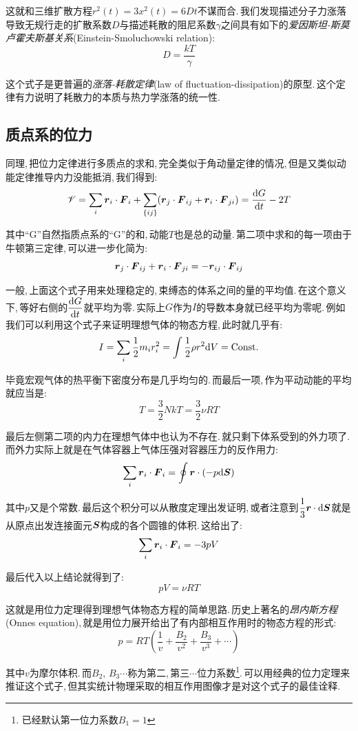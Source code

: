 这就和三维扩散方程$r^2(t)=3x^2(t)=6Dt$不谋而合.\,我们发现描述分子力涨落导致无规行走的扩散系数$D$与描述耗散的阻尼系数$\gamma$之间具有如下的\emph{爱因斯坦-斯莫卢霍夫斯基关系}(Einstein-Smoluchowski relation):
\[D=\frac{kT}{\gamma}\]

这个式子是更普遍的\emph{涨落-耗散定律}(law of fluctuation-dissipation)的原型.\,这个定律有力说明了耗散力的本质与热力学涨落的统一性.

\subsection{质点系的位力}
同理,\,把位力定律进行多质点的求和,\,完全类似于角动量定律的情况,\,但是又类似动能定律推导内力没能抵消,\,我们得到:
\[\mathscr{V}=\sum_i \boldsymbol{r}_i\cdot\boldsymbol{F}_i+\sum_{\{ij\}}(\boldsymbol{r}_j\cdot\boldsymbol{F}_{ij}+\boldsymbol{r}_i\cdot\boldsymbol{F}_{ji})=\frac{\textrm{d} G}{\textrm{d} t}-2T\]

其中``G''自然指质点系的``G''的和,\,动能$T$也是总的动量.\,第二项中求和的每一项由于牛顿第三定律,\,可以进一步化简为:
\[\boldsymbol{r}_j\cdot\boldsymbol{F}_{ij}+\boldsymbol{r}_i\cdot\boldsymbol{F}_{ji}=-\boldsymbol{r}_{ij}\cdot\boldsymbol{F}_{ij}\]

一般,\,上面这个式子用来处理稳定的,\,束缚态的体系之间的量的平均值.\,在这个意义下,\,等好右侧的$\dfrac{\textrm{d} G}{\textrm{d} t}$就平均为零.\,实际上$G$作为$I$的导数本身就已经平均为零呢.\,例如我们可以利用这个式子来证明理想气体的物态方程,\,此时就几乎有:
\[I=\sum_i \frac{1}{2}m_i r_i^2=\int \frac{1}{2}\rho r^2 \textrm{d} V={\rm Const.}\]

毕竟宏观气体的热平衡下密度分布是几乎均匀的.\,而最后一项,\,作为平动动能的平均就应当是:
\[T=\frac{3}{2}NkT=\frac{3}{2}\nu RT\]

最后左侧第二项的内力在理想气体中也认为不存在.\,就只剩下体系受到的外力项了.\,而外力实际上就是在气体容器上气体压强对容器压力的反作用力:
\[\sum_i \boldsymbol{r}_i\cdot\boldsymbol{F}_i=\oint \boldsymbol{r}\cdot(-p\textrm{d} \boldsymbol{S})\]

其中$p$又是个常数.\,最后这个积分可以从散度定理出发证明,\,或者注意到$\dfrac{1}{3}\boldsymbol{r}\cdot \textrm{d} \boldsymbol{S}$就是从原点出发连接面元$\boldsymbol{S}$构成的各个圆锥的体积.\,这给出了:
\[\sum_i \boldsymbol{r}_i\cdot\boldsymbol{F}_i=-3pV\]

最后代入以上结论就得到了:
\[pV=\nu RT\]

这就是用位力定理得到理想气体物态方程的简单思路.\,历史上著名的\emph{昂内斯方程}(Onnes equation),\,就是用位力展开给出了有内部相互作用时的物态方程的形式:
\[p=RT\left(\frac{1}{v}+\frac{B_2}{v^2}+\frac{B_3}{v^3}+\cdots\right)\]

其中$v$为摩尔体积.\,而$B_2,\,B_3\cdots$称为第二,\,第三$\cdots$位力系数\footnote{已经默认第一位力系数$B_1=1$}.\,可以用经典的位力定理来推证这个式子,\,但其实统计物理采取的相互作用图像才是对这个式子的最佳诠释.

